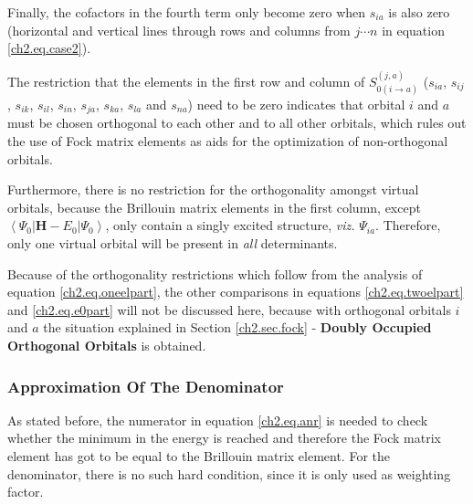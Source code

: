 Finally, the cofactors in the fourth term only become zero when $s_{ia}$ is also zero (horizontal and vertical lines through rows and columns from $j \cdots n$ in equation \ref{ch2.eq.case2}). 

The restriction that the elements in the first row and column of $S_{0(i\rightarrow a)}^{(j,a)}$ ($s_{ia}$, $s_{ij}$, $s_{ik}$, $s_{il}$, $s_{in}$, $s_{ja}$, $s_{ka}$, $s_{la}$ and $s_{na}$) need to be zero indicates that orbital $i$ and $a$ must be chosen orthogonal to each other and to all other orbitals, which rules out the use of Fock matrix elements as aids for the optimization of non-orthogonal orbitals. 

Furthermore, there is no restriction for the orthogonality amongst virtual orbitals, because the Brillouin matrix elements in the first column, except $\left< \Psi_0 | \mathbf{H} - E_0 | \Psi_0 \right>$, only contain a singly excited structure, \textit{viz.} $\Psi_{ia}$. Therefore, only one virtual orbital will be present in \textit{all} determinants.

Because of the orthogonality restrictions which follow from the analysis of equation \ref{ch2.eq.oneelpart}, the other comparisons in equations \ref{ch2.eq.twoelpart} and \ref{ch2.eq.e0part} will not be discussed here, because with orthogonal orbitals $i$ and $a$ the situation explained in Section \ref{ch2.sec.fock} - \textbf{Doubly Occupied Orthogonal Orbitals} is obtained.

\subsubsection{\label{ch2.sec.denominator}Approximation Of The Denominator}

As stated before, the numerator in equation \ref{ch2.eq.anr} is needed to check whether the minimum in the energy is reached and therefore the Fock matrix element has got to be equal to the Brillouin matrix element. For the denominator, there is no such hard condition, since it is only used as weighting factor. 

